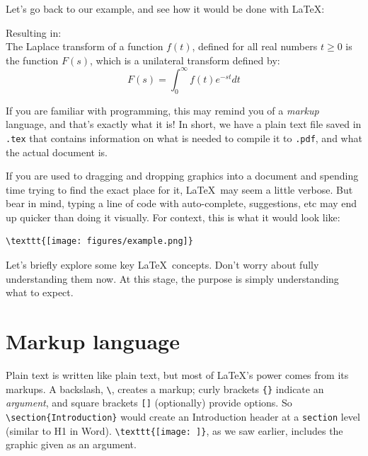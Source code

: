         Let's go back to our example, and see how it would be done with \LaTeX:
        
        Resulting in:\\
        The Laplace transform of a function $f(t)$, defined for all real numbers $t \geq 0$ is the function $F(s)$, which is a unilateral transform defined by:
        \begin{equation*}
            F(s) = \int_0^\infty f(t)e^{-st} dt
        \end{equation*}

        If you are familiar with programming, this may remind you of a \emph{markup} language, and that's exactly what it is!
        In short, we have a plain text file saved in \texttt{.tex} that contains information on what is needed to compile it to \texttt{.pdf}, and what the actual document is.

        If you are used to dragging and dropping graphics into a document and spending time trying to find the exact place for it, \LaTeX\ may seem a little verbose.
        But bear in mind, typing a line of code with auto-complete, suggestions, etc may end up quicker than doing it visually.
        For context, this is what it would look like:
        \begin{lstlisting}
\texttt{[image: figures/example.png]}
        \end{lstlisting}

        Let's briefly explore some key \LaTeX\ concepts.
        Don't worry about fully understanding them now.
        At this stage, the purpose is simply understanding what to expect.

\section{Markup language}
    Plain text is written like plain text, but most of LaTeX's power comes from its markups.
    A backslash, \verb|\|, creates a markup; curly brackets \verb|{}| indicate an \emph{argument}, and square brackets \verb|[]| (optionally) provide options.
    So \verb|\section{Introduction}| would create an Introduction header at a \texttt{section} level (similar to H1 in Word). 
    \verb|\texttt{[image: ]}|, as we saw earlier, includes the graphic given as an argument.

